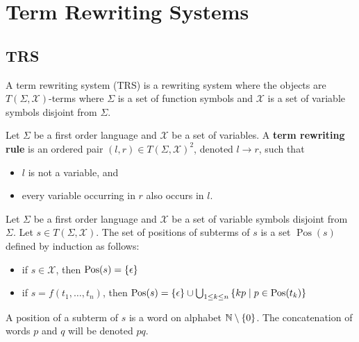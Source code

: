 \section{Term Rewriting Systems}

\subsection{TRS}
A term rewriting system (TRS) is a rewriting system where the objects are $T(\Sigma,\mathcal{X})$-terms where $\Sigma$ is a set of function symbols and $\mathcal{X}$ is a set of variable symbols disjoint from $\Sigma$.
  
\begin{definition}
    Let $\Sigma$ be a first order language and $\mathcal{X}$ be a set of variables. A \textbf{term rewriting rule} is an ordered pair $(l,r) \in T(\Sigma, \mathcal{X})^2$, denoted $l \to r$, such that
    \begin{itemize}
      \item $l$ is not a variable, and
      \item every variable occurring in $r$ also occurs in $l$.
    \end{itemize}
  \end{definition}
  
  \begin{definition}
    Let $\Sigma$ be a first order language and $\mathcal{X}$ be a set of variable symbols disjoint from $\Sigma$. Let $s \in T(\Sigma, \mathcal{X})$.
    The set of positions of subterms of $s$ is a set $\operatorname{Pos}(s)$ defined by induction as follows:
    \begin{itemize}
      \item if $s \in \mathcal{X}$, then $\operatorname{Pos}(s) = \{\epsilon\}$
      \item if $s = f(t_1,\hdots,t_n)$, 
            then $\operatorname{Pos}(s) = \{\epsilon\} \cup \bigcup_{1 \leq k \leq n} \left \{kp\mid p \in \operatorname{Pos}(t_k) \right \}$
  \end{itemize}
  A position of a subterm of $s$ is a word on alphabet $\mathbb{N}\setminus\{0\}$. 
    The concatenation of words $p$ and $q$ will be denoted $pq$.
  \end{definition}


